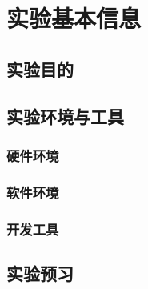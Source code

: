 \section{实验基本信息}

\subsection{实验目的}

\subsection{实验环境与工具}

\subsubsection{硬件环境}

\subsubsection{软件环境}

\subsubsection{开发工具}

\subsection{实验预习}

